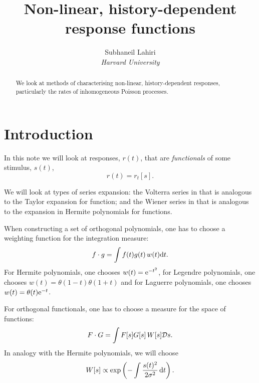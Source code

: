 \documentclass[12pt]{article}
\title{Non-linear, history-dependent response functions}
\author{Subhaneil Lahiri
\\
%
%
\small{\emph{Harvard University}}
%
}
\theoremstyle{slplain}
\theoremstyle{sldefinition}
\theoremstyle{remark}
\begin{document}
\maketitle




\begin{abstract}
  We look at methods of characterising non-linear, history-dependent responses, particularly the rates of inhomogeneous Poisson processes.
\end{abstract}



\section{Introduction}\label{sec:intro}

In this note we will look at responses, $r(t)$, that are \emph{functionals} of some stimulus, $s(t)$,
%
\begin{equation}\label{eq:response}
  r(t) = r_t[s].
\end{equation}
%

We will look at types of series expansion: the Volterra series in  that is analogous to the Taylor expansion for function; and the Wiener series in  that is analogous to the expansion in Hermite polynomials for functions.

When constructing a set of orthogonal polynomials, one has to choose a weighting function for the integration measure:
%
\begin{equation}\label{eq:functionprod}
  f \cdot g = \int f(t) g(t)\, w(t) \mathrm{d} t.
\end{equation}
%
For Hermite polynomials, one chooses $w(t)=\mathrm{e}^{-t^2}$, for Legendre polynomials, one chooses $w(t)=\theta(1-t)\theta(1+t)$ and for Laguerre polynomials, one chooses $w(t)=\theta(t)\mathrm{e}^{-t}$.

For orthogonal functionals, one has to choose a measure for the space of functions:
%
\begin{equation}\label{eq:functionalprod}
  F \cdot G = \int F[s] G[s]\, W[s] \mathcal{D} s.
\end{equation}
%
In analogy with the Hermite polynomials, we will choose
%
\begin{equation}\label{eq:whitenoisemeasure}
  W[s] \propto \exp\left ( -\int \frac{s(t)^2}{2\sigma^2}\,\mathrm{d} t \right ).
\end{equation}
%
\end{document}
